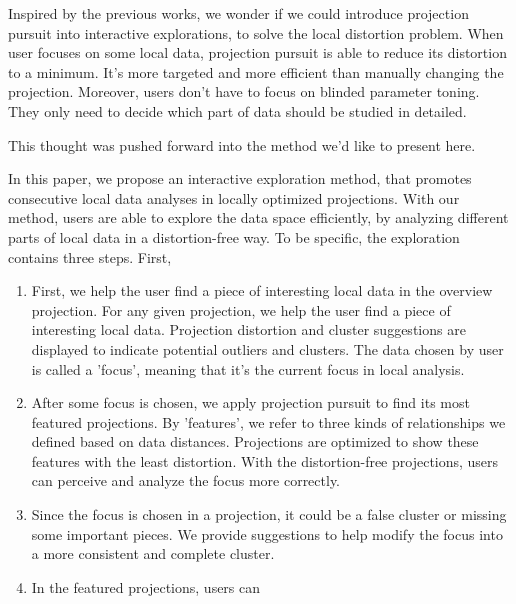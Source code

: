 Inspired by the previous works, we wonder if we could introduce projection pursuit into interactive explorations, to solve the local distortion problem. When user focuses on some local data, projection pursuit is able to reduce its distortion to a minimum. It's more targeted and more efficient than manually changing the projection. Moreover, users don't have to focus on blinded parameter toning. They only need to decide which part of data should be studied in detailed.

This thought was pushed forward into the method we'd like to present here.

In this paper, we propose an interactive exploration method, that promotes consecutive local data analyses in locally optimized projections. With our method, users are able to explore the data space efficiently, by analyzing different parts of local data in a distortion-free way. To be specific, the exploration contains three steps. First,
\begin{enumerate}[(1)]
 \item First, we help the user find a piece of interesting local data in the overview projection.
 For any given projection, we help the user find a piece of interesting local data. Projection distortion and cluster suggestions are displayed to indicate potential outliers and clusters. The data chosen by user is called a 'focus', meaning that it's the current focus in local analysis.
 \item After some focus is chosen, we apply projection pursuit to find its most featured projections. By 'features', we refer to three kinds of relationships we defined based on data distances. Projections are optimized to show these features with the least distortion. With the distortion-free projections, users can perceive and analyze the focus more correctly.
 \item Since the focus is chosen in a projection, it could be a false cluster or missing some important pieces. We provide suggestions to help modify the focus into a more consistent and complete cluster.
 \item In the featured projections, users can
\end{enumerate}

